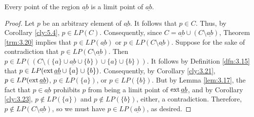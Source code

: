 \documentclass[../main.tex]{subfiles}
\begin{document}
\begin{corollary}\label{cly:5.5}
    Every point of the region $\underline{ab}$ is a limit point of $\underline{ab}$.
    \begin{proof}
        Let $p$ be an arbitrary element of $\underline{ab}$. It follows that $p\in C$. Thus, by Corollary \ref{cly:5.4}, $p\in LP(C)$. Consequently, since $C=\underline{ab}\cup(C\setminus\underline{ab})$, Theorem \ref{trm:3.20} implies that $p\in LP(\underline{ab})$ or $p\in LP(C\setminus\underline{ab})$. Suppose for the sake of contradiction that $p\in LP(C\setminus\underline{ab})$. Then $p\in LP((C\setminus(\{a\}\cup\underline{ab}\cup\{b\})\cup\{a\}\cup\{b\}))$. It follows by Definition \ref{dfn:3.15} that $p\in LP(\operatorname{ext}\underline{ab}\cup\{a\}\cup\{b\})$. Consequently, by Corollary \ref{cly:3.21}, $p\in LP(\operatorname{ext}\underline{ab})$, $p\in LP(\{a\})$, or $p\in LP(\{b\})$. But by Lemma \ref{lem:3.17}, the fact that $p\in\underline{ab}$ prohibits $p$ from being a limit point of $\operatorname{ext}\underline{ab}$, and by Corollary \ref{cly:3.23}, $p\notin LP(\{a\})$ and $p\notin LP(\{b\})$, either, a contradiction. Therefore, $p\notin LP(C\setminus\underline{ab})$, so we must have $p\in LP(\underline{ab})$, as desired.
    \end{proof}
\end{corollary}
\end{document}
